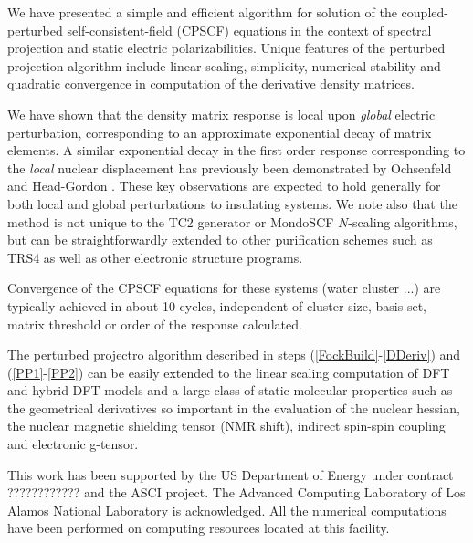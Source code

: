 \documentclass[prl,aps,letterpaper,twocolumn,showpacs,twocolumngrid,superbib]{revtex4}
\begin{document}
We have presented a simple and efficient algorithm for solution 
of the coupled-perturbed self-consistent-field (CPSCF) equations 
in the context of spectral projection and static
electric polarizabilities. Unique features of the perturbed 
projection algorithm include linear scaling, simplicity, numerical 
stability and quadratic convergence in computation of the derivative
density matrices.

We have shown that the density matrix response is local 
upon {\em global} electric perturbation, corresponding to an approximate 
exponential decay of matrix elements. A similar exponential decay
in the first order response corresponding to the {\em local} nuclear 
displacement has previously been demonstrated by Ochsenfeld and 
Head-Gordon \cite{Ochsenfeld97}. These key observations are expected to
hold generally for both local and global perturbations to insulating systems.  
We note also that the method is not unique to the TC2 generator or 
{\sc MondoSCF} $N$-scaling algorithms, but can be straightforwardly 
extended to other purification schemes such as TRS4 \cite{ANiklasson03} as
well as other electronic structure programs.

Convergence of the CPSCF equations for these systems (water cluster ...)
are typically achieved in about 10 cycles, independent of cluster size, basis set,
matrix threshold or order of the response calculated.

The perturbed projectro algorithm described in steps (\ref{FockBuild}-\ref{DDeriv}) and 
(\ref{PP1}-\ref{PP2})
can be easily extended to the linear scaling computation of
DFT and hybrid DFT models and a large class of static molecular properties
such as the geometrical derivatives so important
in the evaluation of the nuclear hessian, the nuclear magnetic
shielding tensor (NMR shift), indirect spin-spin coupling and
electronic g-tensor.


\begin{acknowledgments}
 This work has been supported by the US Department of Energy 
 under contract ???????????? and the ASCI project.  
 The Advanced Computing Laboratory of Los 
 Alamos National Laboratory is acknowledged.
 All the numerical computations have been
 performed on computing resources located at this facility.
\end{acknowledgments}

\end{document}
